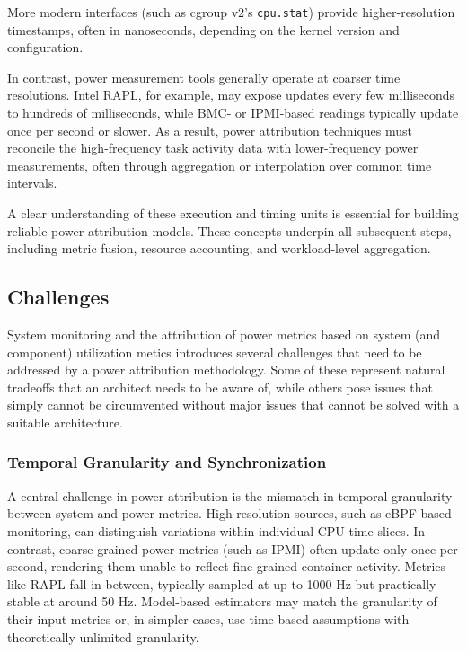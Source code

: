 More modern interfaces (such as cgroup v2’s \texttt{cpu.stat}) provide higher-resolution timestamps, often in nanoseconds, depending on the kernel version and configuration.

In contrast, power measurement tools generally operate at coarser time resolutions. Intel RAPL, for example, may expose updates every few milliseconds to hundreds of milliseconds, while BMC- or IPMI-based readings typically update once per second or slower. As a result, power attribution techniques must reconcile the high-frequency task activity data with lower-frequency power measurements, often through aggregation or interpolation over common time intervals.

A clear understanding of these execution and timing units is essential for building reliable power attribution models. These concepts underpin all subsequent steps, including metric fusion, resource accounting, and workload-level aggregation.

\subsection{Challenges}
\label{ch:limitations}

System monitoring and the attribution of power metrics based on system (and component) utilization metics introduces several challenges that need to be addressed by a power attribution methodology. Some of these represent natural tradeoffs that an architect needs to be aware of, while others pose issues that simply cannot be circumvented without major issues that cannot be solved with a suitable architecture.

\subsubsection*{Temporal Granularity and Synchronization}

A central challenge in power attribution is the mismatch in temporal granularity between system and power metrics. High-resolution sources, such as eBPF-based monitoring, can distinguish variations within individual CPU time slices. In contrast, coarse-grained power metrics (such as IPMI) often update only once per second, rendering them unable to reflect fine-grained container activity. Metrics like RAPL fall in between, typically sampled at up to 1000 Hz but practically stable at around 50 Hz. Model-based estimators may match the granularity of their input metrics or, in simpler cases, use time-based assumptions with theoretically unlimited granularity.

